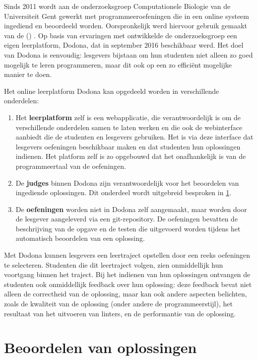 Sinds 2011 wordt aan de onderzoeksgroep Computationele Biologie van de Universiteit Gent gewerkt met programmeeroefeningen die in een online systeem ingediend en beoordeeld worden.
Oorspronkelijk werd hiervoor gebruik gemaakt van de  () \autocite{10.1007/978-3-540-78139-4_31}.
Op basis van ervaringen met  ontwikkelde de onderzoeksgroep een eigen leerplatform, Dodona, dat in september 2016 beschikbaar werd.
Het doel van Dodona is eenvoudig: lesgevers bijstaan om hun studenten niet alleen zo goed mogelijk te leren programmeren, maar dit ook op een zo efficiënt mogelijke manier te doen.

Het online leerplatform Dodona kan opgedeeld worden in verschillende onderdelen:
\begin{enumerate}
    \item Het \textbf{leerplatform} zelf is een webapplicatie, die verantwoordelijk is om de verschillende onderdelen samen te laten werken en die ook de webinterface aanbiedt die de studenten en lesgevers gebruiken.
    Het is via deze interface dat lesgevers oefeningen beschikbaar maken en dat studenten hun oplossingen indienen.
    Het platform zelf is zo opgebouwd dat het onafhankelijk is van de programmeertaal van de oefeningen.
    \item De \textbf{judges} binnen Dodona zijn verantwoordelijk voor het beoordelen van ingediende oplossingen.
    Dit onderdeel wordt uitgebreid besproken in \cref{sec:evalueren-van-een-oplossing}.
    \item De \textbf{oefeningen} worden niet in Dodona zelf aangemaakt, maar worden door de lesgever aangeleverd via een git-repository.
    De oefeningen bevatten de beschrijving van de opgave en de testen die uitgevoerd worden tijdens het automatisch beoordelen van een oplossing.
\end{enumerate}

Met Dodona kunnen lesgevers een leertraject opstellen door een reeks oefeningen te selecteren.
Studenten die dit leertraject volgen, zien onmiddellijk hun voortgang binnen het traject.
Bij het indienen van hun oplossingen ontvangen de studenten ook onmiddellijk feedback over hun oplossing: deze feedback bevat niet alleen de correctheid van de oplossing, maar kan ook andere aspecten belichten, zoals de kwaliteit van de oplossing (onder andere de programmeerstijl), het resultaat van het uitvoeren van linters, en de performantie van de oplossing.

\section{Beoordelen van oplossingen}\label{sec:evalueren-van-een-oplossing}

